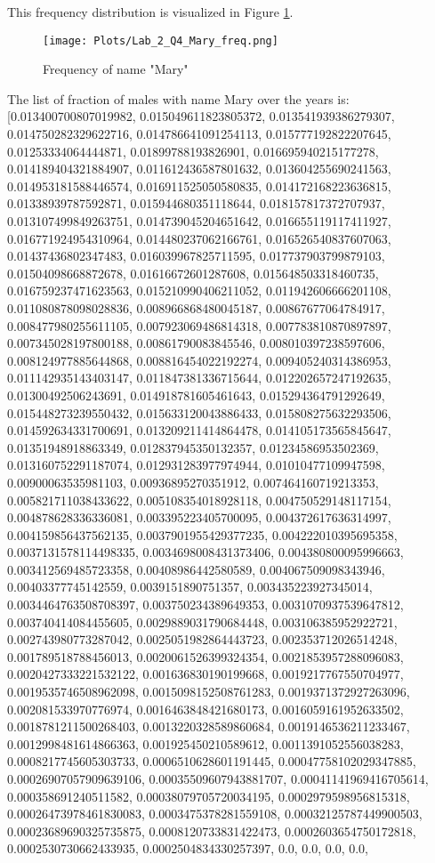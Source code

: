 \documentclass[12pt]{article}%
\begin{document}
This frequency distribution is visualized in Figure \ref{fig:Q4_freq}.

\begin{figure}
\texttt{[image: Plots/Lab\_2\_Q4\_Mary\_freq.png]}
\centering
\caption{Frequency of name "Mary"}
\label{fig:Q4_freq}
\centering
\end{figure}


The list of fraction of males with name  Mary  over the years is: [0.013400700807019982, 0.015049611823805372, 0.013541939386279307, 0.014750282329622716, 0.014786641091254113, 0.015777192822207645, 0.01253334064444871, 0.01899788193826901, 0.016695940215177278, 0.014189404321884907, 0.011612436587801632, 0.013604255690241563, 0.014953181588446574, 0.016911525050580835, 0.014172168223636815, 0.01338939787592871, 0.015944680351118644, 0.018157817372707937, 0.013107499849263751, 0.014739045204651642, 0.016655119117411927, 0.016771924954310964, 0.014480237062166761, 0.016526540837607063, 0.01437436802347483, 0.016039967825711595, 0.017737903799879103, 0.01504098668872678, 0.01616672601287608, 0.015648503318460735, 0.016759237471623563, 0.015210990406211052, 0.011942606666201108, 0.011080878098028836, 0.008966868480045187, 0.00867677064784917, 0.008477980255611105, 0.007923069486814318, 0.007783810870897897, 0.007345028197800188, 0.00861790083845546, 0.008010397238597606, 0.008124977885644868, 0.008816454022192274, 0.009405240314386953, 0.011142935143403147, 0.011847381336715644, 0.012202657247192635, 0.01300492506243691, 0.014918781605461643, 0.015294364791292649, 0.015448273239550432, 0.015633120043886433, 0.015808275632293506, 0.014592634331700691, 0.013209211414864478, 0.014105173565845647, 0.01351948918863349, 0.012837945350132357, 0.01234586953502369, 0.013160752291187074, 0.012931283977974944, 0.01010477109947598, 0.00900063535981103, 0.00936895270351912, 0.007464160719213353, 0.005821711038433622, 0.005108354018928118, 0.004750529148117154, 0.004878628336336081, 0.003395223405700095, 0.004372617636314997, 0.004159856437562135, 0.0037901955429377235, 0.004222010395695358, 0.0037131578114498335, 0.0034698008431373406, 0.004380800095996663, 0.003412569485723358, 0.00408986442580589, 0.004067509098343946, 0.00403377745142559, 0.0039151890751357, 0.003435223927345014, 0.0034464763508708397, 0.003750234389649353, 0.0031070937539647812, 0.003740414084455605, 0.0029889031790684448, 0.003106385952922721, 0.002743980773287042, 0.0025051982864443723, 0.002353712026514248, 0.001789518788456013, 0.0020061526399324354, 0.0021853957288096083, 0.0020427333221532122, 0.001636830190199668, 0.0019217767550704977, 0.0019535746508962098, 0.0015098152508761283, 0.0019371372927263096, 0.002081533970776974, 0.0016463848421680173, 0.0016059161952633502, 0.0018781211500268403, 0.0013220328589860684, 0.0019146536211233467, 0.0012998481614866363, 0.001925450210589612, 0.0011391052556038283, 0.0008217745605303733, 0.0006510628601191445, 0.00047758102029347885, 0.00026907057909639106, 0.00035509607943881707, 0.00041141969416705614, 0.000358691240511582, 0.00038079705720034195, 0.0002979598956815318, 0.00026473978461830083, 0.0003475378281559108, 0.00032125787449900503, 0.00023689690325735875, 0.0008120733831422473, 0.0002603654750172818, 0.0002530730662433935, 0.0002504834330257397, 0.0, 0.0, 0.0, 0.0, 
\end{document}
